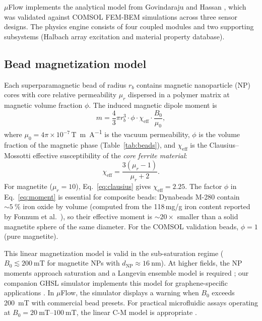 \documentclass[preprint,review,12pt]{elsarticle}
\begin{document}
$\mu$Flow implements the analytical model from Govindaraju and Hassan \cite{govindaraju2025}, which was validated against COMSOL FEM-BEM simulations across three sensor designs. The physics engine consists of four coupled modules and two supporting subsystems (Halbach array excitation and material property database).

\subsection{Bead magnetization model}
\label{sec:magnetization}

Each superparamagnetic bead of radius $r_b$ contains magnetic nanoparticle (NP) cores with core relative permeability $\mu_r$ dispersed in a polymer matrix at magnetic volume fraction $\phi$. The induced magnetic dipole moment is
\begin{equation}
m = \frac{4}{3}\pi r_b^3 \cdot \phi \cdot \chi_{\text{eff}} \cdot \frac{B_0}{\mu_0},
\label{eq:moment}
\end{equation}
where $\mu_0 = 4\pi \times 10^{-7}$\,\si{\tesla\meter\per\ampere} is the vacuum permeability, $\phi$ is the volume fraction of the magnetic phase (Table~\ref{tab:beads}), and $\chi_{\text{eff}}$ is the Clausius--Mossotti effective susceptibility of the \textit{core ferrite material}:
\begin{equation}
\chi_{\text{eff}} = \frac{3(\mu_r - 1)}{\mu_r + 2}.
\label{eq:clausius}
\end{equation}
For magnetite ($\mu_r = 10$), Eq.~\eqref{eq:clausius} gives $\chi_{\text{eff}} = 2.25$. The factor $\phi$ in Eq.~\eqref{eq:moment} is essential for composite beads: Dynabeads M-280 contain ${\sim}\SI{5}{\percent}$ iron oxide by volume (computed from the 118\,mg/g iron content reported by Fonnum et al.\ \cite{fonnum2005}), so their effective moment is ${\sim}20\times$ smaller than a solid magnetite sphere of the same diameter. For the COMSOL validation beads, $\phi = 1$ (pure magnetite).

This linear magnetization model is valid in the sub-saturation regime ($B_0 \lesssim \SI{200}{\milli\tesla}$ for magnetite NPs with $d_\text{NP} \approx \SI{16}{\nano\meter}$). At higher fields, the NP moments approach saturation and a Langevin ensemble model is required \cite{elfimova2019,henrard2019}; our companion GHSL simulator implements this model for graphene-specific applications \cite{govindaraju2025}. In $\mu$Flow, the simulator displays a warning when $B_0$ exceeds \SI{200}{\milli\tesla} with commercial bead presets. For practical microfluidic assays operating at $B_0 = \SIrange{20}{100}{\milli\tesla}$, the linear C-M model is appropriate \cite{ota2019}.
\end{document}
